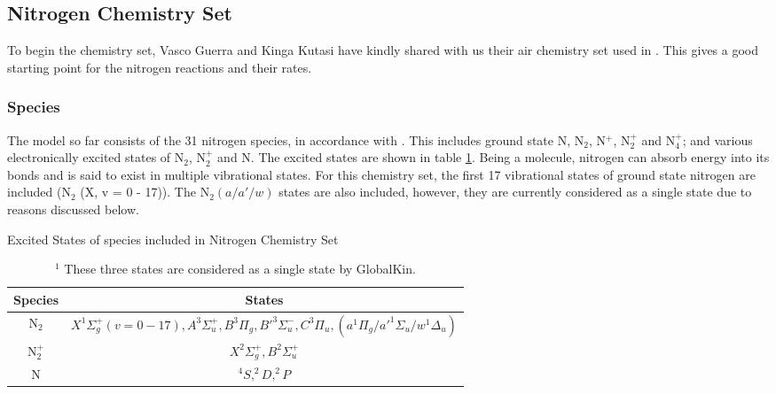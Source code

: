 \documentclass[11pt, oneside]{article}   	%
\begin{document}
\subsection{Nitrogen Chemistry Set}
To begin the chemistry set, Vasco Guerra and Kinga Kutasi have kindly shared with us their air chemistry set used in \cite{Kutasi2016tuning}.
This gives a good starting point for the nitrogen reactions and their rates.

\subsubsection{Species}

The model so far consists of the 31 nitrogen species, in accordance with \cite{Kutasi2016tuning}.
This includes ground state N, N$_2$, N$^+$, N$_2^+$ and N$_4^+$; and various electronically excited states of N$_2$, N$_2^+$ and N.
The excited states are shown in table \ref{table:Species}.
Being a molecule, nitrogen can absorb energy into its bonds and is said to exist in multiple vibrational states.
For this chemistry set, the first 17 vibrational states of ground state nitrogen are included (N$_2$ (X, v = 0 - 17)).
The N$_2 (a/a'/w)$ states are also included, however, they are currently considered as a single state due to reasons discussed below.



\begin{table}
\caption{Excited States of species included in Nitrogen Chemistry Set}
\begin{center}
\begin{tabular}{| c | c |}
\hline
Species & States \\
\hline\hline \hline
N$_2$ & $X^1\Sigma_g^+  (v = 0 - 17),  A^3\Sigma_u^+, B^3\Pi_g, B'^3\Sigma_u^-, C^3\Pi_u, (a^1\Pi_g/a'^1\Sigma_u/w^1\Delta_u)$\footnotemark  \\
\hline
N$_2^+$ & $X^2\Sigma_g^+, B^2\Sigma_u^+ $ \\
\hline
N & $^4S, ^2D,  ^2P$ \\
\hline
\end{tabular}
\end{center}
\label{table:Species}
\caption*{$^1$ These three states are considered as a single state by GlobalKin.}
\end{table}
\end{document}
